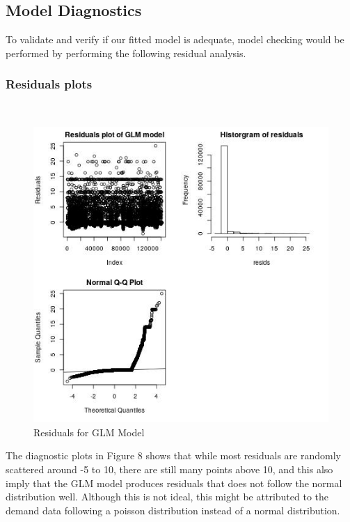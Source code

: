 \documentclass[nonblindrev,msom]{informs3} %
\begin{document}
\subsection{Model Diagnostics}
To validate and verify if our fitted model is adequate, model checking would be performed by performing the following residual analysis.		

\newpage
\subsubsection{Residuals plots}
\hfill\\
\begin{figure}[H]
    \centering
    \includegraphics[width=\textwidth, height=0.7\textheight]{Images/Full_GLM_resids.jpg}
    \caption{Residuals for GLM Model}
    \label{fig:Residuals for GLM Model}
\end{figure}

\noindent The diagnostic plots in Figure 8 shows that while most residuals are randomly scattered around -5 to 10, there are still many points above 10, and this also imply that the GLM model produces residuals that does not follow the normal distribution well. Although this is not ideal, this might be attributed to the demand data following a poisson distribution instead of a normal distribution. 
\end{document}
